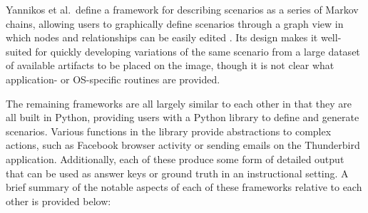 \documentclass[letterpaper,12pt]{report}
\begin{document}
Yannikos et al.~define a framework for describing scenarios as a series
of Markov chains, allowing users to graphically define scenarios through
a graph view in which nodes and relationships can be easily edited
\cite{yannikosDataCorporaDigital2014}. Its design makes it
well-suited for quickly developing variations of the same scenario from
a large dataset of available artifacts to be placed on the image, though
it is not clear what application- or OS-specific routines are provided.

The remaining frameworks are all largely similar to each other in that
they are all built in Python, providing users with a Python library to
define and generate scenarios. Various functions in the library provide
abstractions to complex actions, such as Facebook browser activity or
sending emails on the Thunderbird application. Additionally, each of
these produce some form of detailed output that can be used as answer
keys or ground truth in an instructional setting. A brief summary of the
notable aspects of each of these frameworks relative to each other is
provided below:
\end{document}
